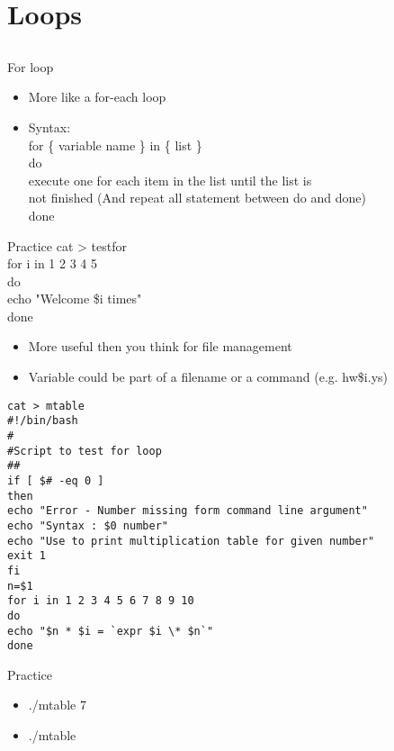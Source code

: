 \documentclass{beamer}
\begin{document}
\section{Loops}
\subsection{}

\begin{frame}{For loop}
\begin{itemize}
\item More like a for-each loop
\item Syntax: \\
for \{ variable name \} in \{ list \} \\
do \\
execute one for each item in the list until the list is \\
not finished (And repeat all statement between do and done) \\
done \\
\end{itemize}
\end{frame}

\begin{frame}{Practice}
cat > testfor \\
for i in 1 2 3 4 5 \\
do \\
echo "Welcome \$i times" \\
done
\begin{itemize}
\item More useful then you think for file management
\item Variable could be part of a filename or a command (e.g. hw\$i.ys)
\end{itemize}
\end{frame}

\begin{frame}[fragile]{}
\begin{lstlisting}
cat > mtable
#!/bin/bash
#
#Script to test for loop
##
if [ $# -eq 0 ]
then
echo "Error - Number missing form command line argument"
echo "Syntax : $0 number"
echo "Use to print multiplication table for given number"
exit 1
fi
n=$1
for i in 1 2 3 4 5 6 7 8 9 10
do
echo "$n * $i = `expr $i \* $n`"
done
\end{lstlisting}
\end{frame}

\begin{frame}{Practice}
\begin{itemize}
\item ./mtable 7
\item ./mtable
\end{itemize}
\end{frame}
\end{document}
